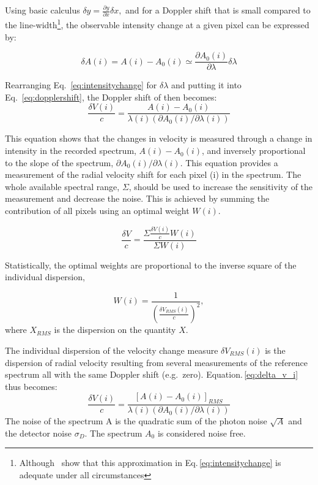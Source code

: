 Using basic calculus \(\delta y = \frac{\partial y}{\partial x} \delta x,  \nonumber\) and for a Doppler shift that is small compared to the line-width\footnote{Although~\citet{connes_absolute_1985} show that this approximation in Eq.\,\ref{eq:intensitychange} is adequate under all circumstances}, the observable intensity change at a given pixel can be expressed by:

\begin{equation}
\delta A(i) = A(i) - A_0(i) \simeq \frac{\partial A_0(i)}{\partial \lambda} \delta \lambda
\label{eq:intensitychange}
\end{equation}

Rearranging Eq.~\ref{eq:intensitychange} for \(\delta \lambda\) and putting it into Eq.~\ref{eq:dopplershift}, the Doppler shift of then becomes:
\begin{equation}
    \frac{\delta V(i)}{c} = \frac{A(i) - A_0(i) }{\lambda(i) (\partial A_0(i)/\partial \lambda(i))} \label{eq:delta_v_i}
\end{equation}

This equation shows that the changes in velocity is measured through a change in intensity in the recorded spectrum, \(A(i)-A_0(i)\), and inversely proportional to the slope of the spectrum, \({\partial A_0(i)}/{\partial \lambda(i)}\).
This equation provides a measurement of the radial velocity shift for each pixel (i) in the spectrum. The whole available spectral range, \(\Sigma\), should be used to increase the sensitivity of the measurement and decrease the noise. This is achieved by summing the contribution of all pixels using an optimal weight \(W(i)\).

\begin{equation}
\frac{\delta V}{c} = \frac{\Sigma{\frac{\delta V(i)}{c}W(i)}}{\Sigma {W(i)}}
\end{equation}

Statistically, the optimal weights are proportional to the inverse square of the individual dispersion,


\begin{equation}
W(i) = \frac{1}{{\left(\frac{\delta V_{RMS}(i)}{c}\right)}^2},  \label{eq:weights}
\end{equation}
where \(X_{RMS}\) is the dispersion on the quantity \(X\).


The individual dispersion of the velocity change measure \(\delta V_{RMS}(i)\) is the dispersion of radial velocity resulting from several measurements of the reference spectrum all with the same Doppler shift (e.g.\ zero). Equation.\,\ref{eq:delta_v_i} thus becomes:
\begin{equation}
    \frac{\delta V(i)}{c} = \frac{{[A(i) - A_0(i)]}_{RMS} }{\lambda(i) (\partial A_0(i)/\partial \lambda(i))} \label{eq:delta_v_i_rms}
\end{equation}
The noise of the spectrum A is the quadratic sum of the photon noise \(\sqrt{A}\) and the detector noise \(\sigma_D\). The spectrum \(A_0\) is considered noise free.

